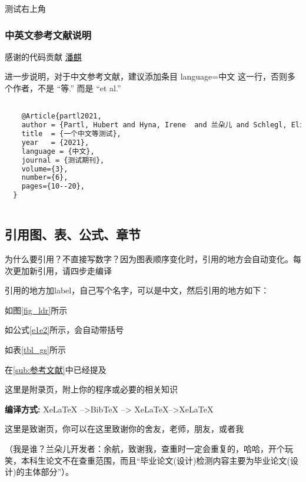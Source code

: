 \documentclass[AutoFakeBold]{LZUThesis}
\begin{document}
测试右上角 

\subsubsection{中英文参考文献说明} %

感谢的代码贡献
\href{https://gitee.com/versemonger}{潘麒}

进一步说明，对于中文参考文献，建议添加条目 language={中文} 这一行，否则多个作者，不是 “等.”\cite{partl2021} 而是 “et al.”\cite{partl2016}
\begin{lstlisting}[language = tex]

    @Article{partl2021,
    author = {Partl, Hubert and Hyna, Irene  and 兰朵儿 and Schlegl, Elisabeth},
    title  = {一个中文等测试},
    year   = {2021},
    language = {中文},
    journal = {测试期刊},
    volume={3},
    number={6},
    pages={10--20},
  }
  
\end{lstlisting}




\subsection{引用图、表、公式、章节} %

为什么要引用？不直接写数字？因为图表顺序变化时，引用的地方会自动变化。每次更加新引用，请四步走编译

引用的地方加label，自己写个名字，可以是中文，然后引用的地方如下：

如图\ref{fig_ldr}所示

如公式\eqref{e1e2}所示，会自动带括号

如表\ref{tbl_gs}所示

在\ref{sub:参考文献}中已经提及


\backmatter


\printbib



\Appendix


这里是附录页，附上你的程序或必要的相关知识

{\bfseries 编译方式:} XeLaTeX -->BibTeX --> XeLaTeX-->XeLaTeX


\Thanks

这里是致谢页，你可以在这里致谢你的舍友，老师，朋友，或者我

（我是谁？兰朵儿开发者：余航，致谢我，查重时一定会重复的，哈哈，开个玩笑，本科生论文不在查重范围，而且“毕业论文(设计)检测内容主要为毕业论文(设计)的主体部分”）。


\Grade %
\end{document}

